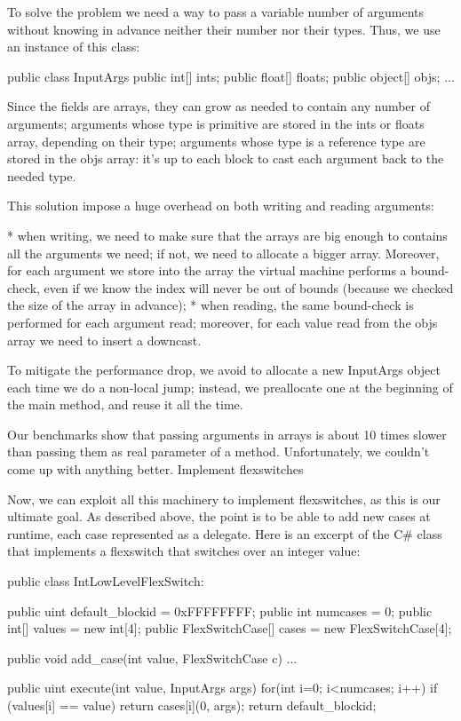 {To solve the problem we need a way to pass a variable number of arguments without knowing in advance neither their number nor their types. Thus, we use an instance of this class:

public class InputArgs {
public int[] ints;
public float[] floats;
public object[] objs;
...
}

Since the fields are arrays, they can grow as needed to contain any number of arguments; arguments whose type is primitive are stored in the ints or floats array, depending on their type; arguments whose type is a reference type are stored in the objs array: it's up to each block to cast each argument back to the needed type.

This solution impose a huge overhead on both writing and reading arguments:

        * when writing, we need to make sure that the arrays are big enough to contains all the arguments we need; if not, we need to allocate a bigger array. Moreover, for each argument we store into the array the virtual machine performs a bound-check, even if we know the index will never be out of bounds (because we checked the size of the array in advance);
        * when reading, the same bound-check is performed for each argument read; moreover, for each value read from the objs array we need to insert a downcast.

To mitigate the performance drop, we avoid to allocate a new InputArgs object each time we do a non-local jump; instead, we preallocate one at the beginning of the main method, and reuse it all the time.

Our benchmarks show that passing arguments in arrays is about 10 times slower than passing them as real parameter of a method. Unfortunately, we couldn't come up with anything better.
Implement flexswitches

Now, we can exploit all this machinery to implement flexswitches, as this is our ultimate goal. As described above, the point is to be able to add new cases at runtime, each case represented as a delegate. Here is an excerpt of the C# class that implements a flexswitch that switches over an integer value:

public class IntLowLevelFlexSwitch:
{
public uint default_blockid = 0xFFFFFFFF;
public int numcases = 0;
public int[] values = new int[4];
public FlexSwitchCase[] cases = new FlexSwitchCase[4];

public void add_case(int value, FlexSwitchCase c)
{
...
}

public uint execute(int value, InputArgs args)
{
for(int i=0; i<numcases; i++)
if (values[i] == value) {
 return cases[i](0, args);
}
return default_blockid;
}
}

}
